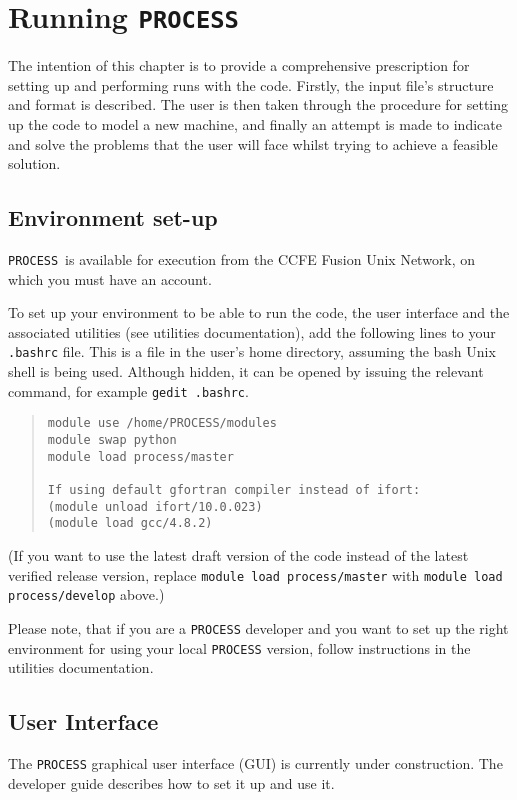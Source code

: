 \documentclass[11pt,a4paper]{report}
\newcommand{\process}{\mbox{\texttt{PROCESS}}}
\newcommand{\setheader}[1]
 {\markright{\rlap{\lower0.8ex\hbox to\textwidth{\hrulefill}}{\bf#1}}}
\newcommand{\mychapter}[1]{\small\normalsize
 \setcounter{footnote}{0}
 \chapter{#1}
 \pagestyle{myheadings}
 \setheader{Chapter \thechapter\hspace{0.8em}#1}}
\begin{document}
\mychapter{Running \process}
\label{chap:run}

The intention of this chapter is to provide a comprehensive prescription for
setting up and performing runs with the code.  Firstly, the input file's
structure and format is described. The user is then taken through the
procedure for setting up the code to model a new machine, and finally an
attempt is made to indicate and solve the problems that the user will face
whilst trying to achieve a feasible solution.

\section{Environment set-up}
\label{sec:run_environment}

 \process\ is available for execution from the CCFE Fusion Unix Network, on which you must have an account.

To set up your environment to be able to run the code, the user interface and the associated
utilities (see utilities documentation), add the following lines to your \texttt{.bashrc} file.  This is a file in the user's home directory, assuming the bash Unix shell is being used.  Although hidden, it can be opened by issuing the relevant command, for example \texttt{gedit .bashrc}.
\begin{quote}
\begin{verbatim}
module use /home/PROCESS/modules
module swap python
module load process/master

If using default gfortran compiler instead of ifort:
(module unload ifort/10.0.023)
(module load gcc/4.8.2)
\end{verbatim}
\end{quote}
(If you want to use the latest draft version of the code instead of the latest verified release version, replace \texttt{module load process/master} with \texttt{module load process/develop} above.)

Please note, that if you are a \process\/ developer and you want to set up the right environment for using your local \process\/ version, follow instructions in the utilities documentation.

\section{User Interface}
\label{sec:gui}
The \process\/ graphical user interface (GUI) is currently under construction. The developer guide describes how to set it up and use it. 
\end{document}
